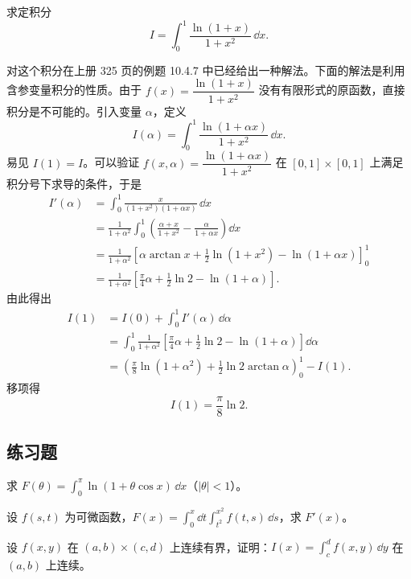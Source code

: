 \begin{xexample}[23.1.6]
求定积分
\[
  I=\int_0^1\frac{\ln(1+x)}{1+x^2}\,\dd x.
\]
\end{xexample}
\begin{xsolution}
对这个积分在上册 325 页的例题 10.4.7 中已经给出一种解法。下面的解法是利用含参变量积分的性质。由于 $f(x)=\dfrac{\ln(1+x)}{1+x^2}$ 没有有限形式的原函数，直接积分是不可能的。引入变量 $\alpha$，定义
\[
  I(\alpha)=\int_0^1\frac{\ln(1+\alpha x)}{1+x^2}\,\dd x.
\]
易见 $I(1)=I$。可以验证 $f(x,\alpha)=\dfrac{\ln(1+\alpha x)}{1+x^2}$ 在 $[0,1]\times[0,1]$ 上满足积分号下求导的条件，于是
\[
\begin{aligned}
  I'(\alpha)&=\int_0^1\frac{x}{(1+x^2)(1+\alpha x)}\,\dd x\\
  &=\frac{1}{1+\alpha^2}\int_0^1\left(\frac{\alpha+x}{1+x^2}-\frac{\alpha}{1+\alpha x}\right)\dd x\\
  &=\frac{1}{1+\alpha^2}\left[\alpha\arctan x+\frac12\ln(1+x^2)-\ln(1+\alpha x)\right]_0^1\\
  &=\frac{1}{1+\alpha^2}\left[\frac\pi4\alpha+\frac12\ln2-\ln(1+\alpha)\right].
\end{aligned}
\]
由此得出
\[
\begin{aligned}
  I(1)&=I(0)+\int_0^1 I'(\alpha)\,\dd\alpha\\
  &=\int_0^1\frac{1}{1+\alpha^2}\left[\frac\pi4\alpha+\frac12\ln2-\ln(1+\alpha)\right]\dd\alpha\\
  &=\left(\frac\pi8\ln(1+\alpha^2)+\frac12\ln2\arctan\alpha\right)_0^1-I(1).
\end{aligned}
\]
移项得
\[
  I(1)=\frac\pi8\ln2.
\]
\end{xsolution}

\subsection{练习题}
\begin{xexercise}[1]
求 $F(\theta)=\displaystyle\int_0^\pi\ln(1+\theta\cos x)\,\dd x$（$|\theta|<1$）。
\end{xexercise}

\begin{xexercise}[2]
设 $f(s,t)$ 为可微函数，$F(x)=\displaystyle\int_0^x\dd t\int_{t^2}^{x^2}f(t,s)\,\dd s$，求 $F'(x)$。
\end{xexercise}

\begin{xexercise}[3]
设 $f(x,y)$ 在 $(a,b)\times(c,d)$ 上连续有界，证明：$I(x)=\displaystyle\int_c^d f(x,y)\,\dd y$ 在 $(a,b)$ 上连续。
\end{xexercise}


